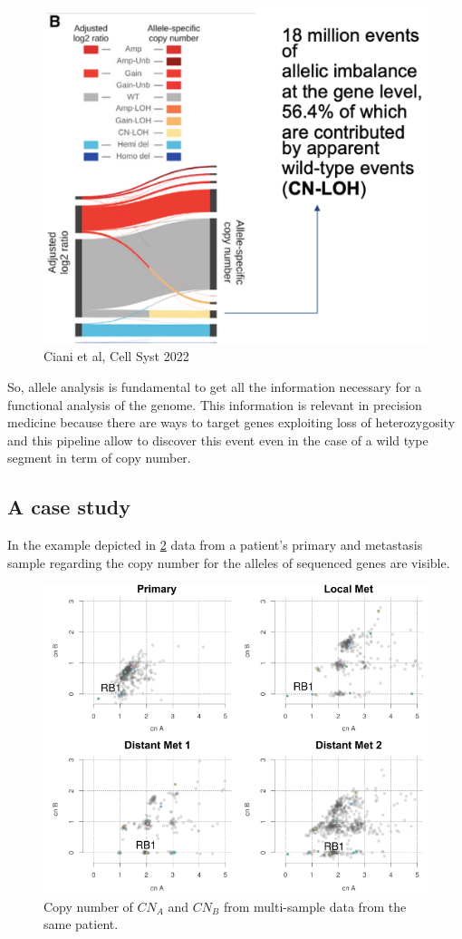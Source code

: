     \begin{figure}[H]
      \centering
      \includegraphics[width=0.5\linewidth]{image14.png}
      \caption{Ciani et al, Cell Syst 2022}
      \label{fig:img14}
    \end{figure}

    So, allele analysis is fundamental to get all the information necessary for a functional analysis of the genome.
    This information is relevant in precision medicine because there are ways to target genes exploiting loss of heterozygosity and this pipeline allow to discover this event even in the case of a wild type segment in term of copy number.

  \subsection{A case study}
  In the example depicted in \ref{fig:img15} data from a patient's primary and metastasis sample regarding the copy number for the alleles of sequenced genes are visible.

  \begin{figure}[H]
    \centering
    \includegraphics[width=0.7\linewidth]{image15.png}
    \caption{Copy number of $CN_A$ and $CN_B$ from multi-sample data from the same patient.}
    \label{fig:img15}
  \end{figure}

